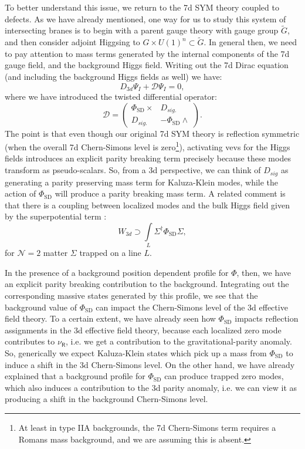 \documentclass[12pt]{article}%
\numberwithin{equation}{section}
\renewcommand{\(}{\left(}
\renewcommand{\)}{\right)}
\renewcommand{\[}{\left[}
\renewcommand{\]}{\right]}
\begin{document}
To better understand this issue, we return to the 7d SYM theory coupled to defects. As we have already mentioned, one way for us to study this
system of intersecting branes is to begin with a parent gauge theory with gauge group $\widetilde{G}$, and then consider adjoint
Higgsing to $G \times U(1)^n \subset \widetilde{G}$. In general then, we need to pay attention to mass terms generated by the internal components of the 7d gauge field, and the background Higgs field. Writing out
the 7d Dirac equation (and including the background Higgs fields as well) we have:
\begin{equation}
D_{3d} \Psi_{I} + \mathcal{D} \Psi_{I} = 0,
\end{equation}
where we have introduced the twisted differential operator:
\begin{equation}
\mathcal{D} = \begin{pmatrix}
\Phi_{\mathrm{SD}}\times & D_{sig.} \\
D_{sig.} & -\Phi_{\mathrm{SD}}\wedge
\end{pmatrix}.
\end{equation}
The point is that even though our original 7d SYM theory is reflection symmetric
(when the overall 7d Chern-Simons level is zero\footnote{At least in type IIA backgrounds,
the 7d Chern-Simons term requires a Romans mass background, and we are assuming this is absent.}),
activating vevs for the Higgs fields introduces an explicit parity breaking term
precisely because these modes transform as pseudo-scalars. So, from a 3d perspective, we can think
of $D_{sig}$ as generating a parity preserving mass term for Kaluza-Klein modes,
while the action of $\Phi_{\mathrm{SD}}$ will produce a parity breaking mass term. A related comment is
that there is a coupling between localized modes and the bulk Higgs field given by the superpotential term
\cite{Heckman:2018mxl}:
\begin{equation}
W_{3d} \supset \underset{L}{\int} \Sigma^{\dag} \Phi_{\mathrm{SD}} \Sigma,
\end{equation}
for $\mathcal{N} = 2$ matter $\Sigma$ trapped on a line $L$.

In the presence of a background position dependent profile for $\Phi$, then, we have an explicit parity breaking contribution
to the background. Integrating out the corresponding massive states generated by this profile,
we see that the background value of $\Phi_{\mathrm{SD}}$ can impact the Chern-Simons level of the 3d effective field theory.
To a certain extent, we have already seen how $\Phi_{\mathrm{SD}}$ impacts reflection assignments in the 3d effective field theory, because
each localized zero mode contributes to $\nu_{\mathsf{R}}$, i.e. we get a contribution to the gravitational-parity anomaly. So, generically we expect Kaluza-Klein states which pick up a mass from $\Phi_{\mathrm{SD}}$ to induce a shift in the 3d Chern-Simons level. On the other hand, we have already explained that a background profile for $\Phi_{\mathrm{SD}}$ can produce trapped zero modes, which also induces a
contribution to the 3d parity anomaly, i.e. we can view it as producing a shift in the background Chern-Simons level.
\end{document}
